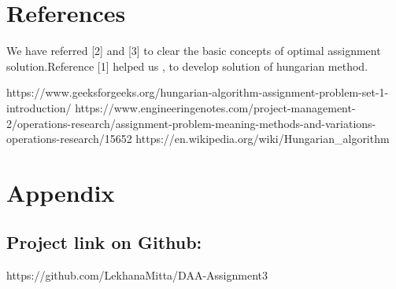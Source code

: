 \documentclass[conference]{IEEEtran}
\begin{document}
\section{References}

We have referred [2] and [3] to clear the basic concepts of optimal assignment solution.Reference [1] helped us , to develop solution of hungarian method.
\begin{thebibliography}{00}
https://www.geeksforgeeks.org/hungarian-algorithm-assignment-problem-set-1-introduction/
https://www.engineeringenotes.com/project-management-2/operations-research/assignment-problem-meaning-methods-and-variations-operations-research/15652
https://en.wikipedia.org/wiki/Hungarian_algorithm
\end{thebibliography}

\section{Appendix}

\subsection{Project link on Github:}
https://github.com/LekhanaMitta/DAA-Assignment3
\end{document}
